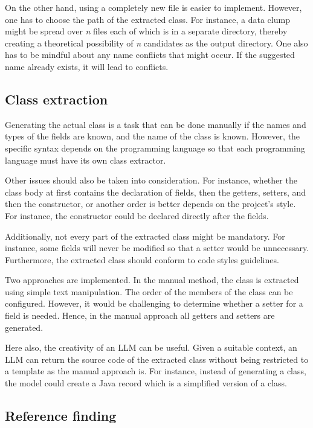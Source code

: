 On the other hand, using a completely new file is easier to implement. However, one has to choose the path of the extracted class. For instance, a data clump might be spread over \textit{n} files each of which is in a separate directory, thereby creating a theoretical possibility of \textit{n} candidates as the output directory. 
One also has to be mindful about any name conflicts that might occur. If the suggested name already exists, it will lead to conflicts.


\subsection{Class extraction}

Generating the actual class is a task that can be done manually if the names and types of the fields are known, and the name of the class is known. However, the specific syntax depends on the programming language so that each programming language must have its own class extractor.

Other issues should also be taken into consideration. For instance, whether the class body at first contains the declaration of fields, then the getters, setters, and then the constructor, or another order is better depends on the project's style. For instance, the constructor could be declared directly after the fields.

Additionally, not every part of the extracted class might be mandatory. For instance, some fields will never be modified so that a setter would be unnecessary. Furthermore, the extracted class should conform to code styles guidelines. 

Two approaches are implemented. In the manual method, the class is extracted using simple text manipulation. The order of the members of the class can be configured.  However, it would be challenging to determine whether a setter for a field is needed. Hence, in the manual approach all getters and setters are generated.

Here also, the creativity of an \ac{LLM} can be useful. Given a suitable context, an \ac{LLM} can return the source code of the extracted class without being restricted to a template as the manual approach is. For instance, instead of generating a class, the model could create a Java record which is a simplified version of a class. 

\subsection{Reference finding}

